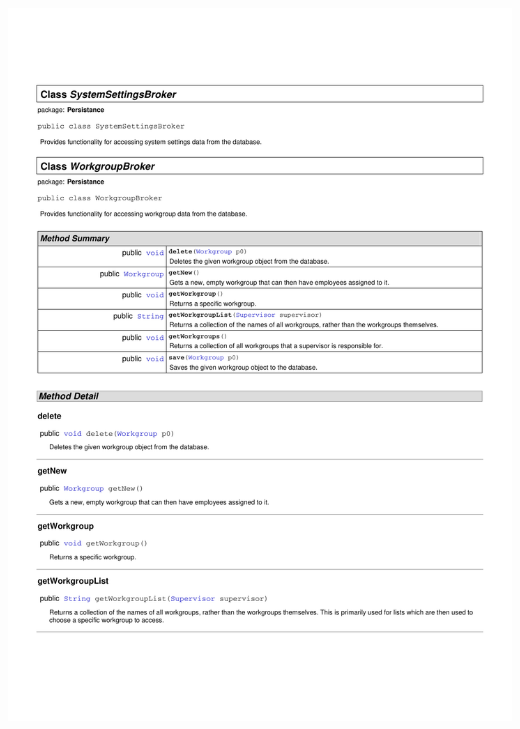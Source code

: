 \documentclass[letterpaper,12pt]{report}
\begin{document}
\includegraphics[scale=0.9,trim=20mm 30mm 25mm 25mm]{externals/PersistanceDataDictionary9.pdf}
\newpage
\end{document}
